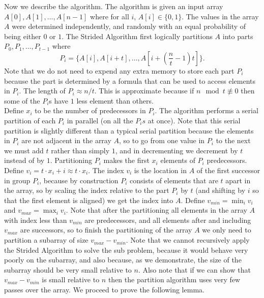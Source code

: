 \documentclass[twocolumn, twoside, 12pt]{article}
\renewcommand{\paragraph}[1]{\vspace{0.09in}\noindent{\bf \boldmath #1.}}
\begin{document}
\paragraph{Definitions}
Now we describe the algorithm.
The algorithm is given an input array $A[0],A[1],\ldots,A[n-1]$ where for all $i$, $A[i] \in \{0, 1\}$.
The values in the array $A$ were determined independently, and randomly with an equal probability of being either $0$ or $1$.
The Strided Algorithm first logically partitions $A$ into parts $P_0, P_1, \ldots, P_{t-1}$ where 
\begin{equation*}
	P_i = \{A[i], A[i+t], \ldots, A[i+(\frac{n}{t}-1)t]\}.
\end{equation*}
Note that we do not need to expend any extra memory to store each part $P_i$ because the part is determined by a formula that can be used to access elements in $P_i$.
The length of $P_i \approx n/t$. This is approximate because if $n \mod t \not\equiv 0$ then some of the $P_i$s have $1$ less element than others.\\
Define $x_i$ to be the number of predecessors in $P_i$.
The algorithm performs a serial partition of each $P_i$ in parallel (on all the $P_is$ at once).
Note that this serial partition is slightly different than a typical serial partition because the elements in $P_i$ are not adjacent in the array $A$, so to go from one value in $P_i$ to the next we must add $t$ rather than simply $1$, and in decrementing we decrement by $t$ instead of by $1$.
Partitioning $P_i$ makes the first $x_i$ elements of $P_i$ predecessors.
Define $v_i = t\cdot x_i+i \approx t\cdot x_i$.
The index $v_i$ is the location in $A$ of the first successor in group $P_i$, because by construction $P_i$ consists of elements that are $t$ apart in the array, so by scaling the index relative to the part $P_i$ by $t$ (and shifting by $i$ so that the first element is aligned) we get the index into $A$.
Define $v_{min} = \min_i{v_i}$ and $v_{max} = \max_i {v_i}$.
Note that after the partitioning all elements in the array $A$ with index less than $v_{min}$ are predecessors, and all elements after and including $v_{max}$ are successors, so to finish the partitioning of the array $A$ we only need to partition a subarray of size $v_{max}-v_{min}$.
Note that we cannot recursively apply the Strided Algorithm to solve the sub problem, because it would behave very poorly on the subarray, and also because, as we demonstrate, the size of the subarray should be very small relative to $n$.
Also note that if we can show that $v_{max} - v_{min}$ is small relative to $n$ then the partition algorithm uses very few passes over the array.
We proceed to prove the following lemma.
\end{document}
